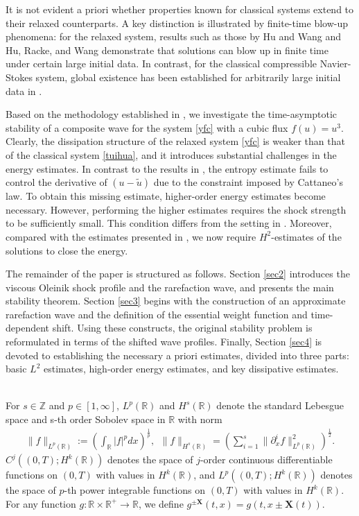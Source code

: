 \documentclass[10pt,reqno]{amsart}
\numberwithin{equation}{section}
\begin{document}
		It is not evident a priori whether properties known for classical systems extend to their relaxed counterparts. A key distinction is illustrated by finite-time blow-up phenomena: for the relaxed system, results such as those by Hu and Wang \cite{ref23} and Hu, Racke, and Wang \cite{ref26} demonstrate that solutions can blow up in finite time under certain large initial data. In contrast, for the classical compressible Navier-Stokes system, global existence has been established for arbitrarily large initial data in \cite{ref28}.
		
		Based on the methodology established in \cite{ref16}, we investigate the time-asymptotic stability of a composite wave for the system \eqref{yfc} with a cubic flux $f(u)=u^3$. Clearly, the dissipation structure of the relaxed system \eqref{yfc} is weaker than that of the classical system \eqref{tuihua}, and it introduces substantial challenges in the energy estimates. In contrast to the results in \cite{ref16}, the entropy estimate fails to control the derivative of $(u-\tilde{u})$ due to the constraint imposed by Cattaneo's law. To obtain this missing estimate, higher-order energy estimates become necessary. However, performing the higher estimates requires the shock strength to be sufficiently small. This condition differs from the setting in \cite{ref16}. Moreover, compared with the estimates presented in \cite{ref16}, we now require $H^2$-estimates of the solutions to close the energy. 
		
		The remainder of the paper is structured as follows. Section \ref{sec2} introduces the viscous Oleinik shock profile and the rarefaction wave, and presents the main stability theorem. Section \ref{sec3} begins with the construction of an approximate rarefaction wave and the definition of the essential weight function and time-dependent shift. Using these constructs, the original stability problem is reformulated in terms of the shifted wave profiles. Finally, Section \ref{sec4} is devoted to establishing the necessary a priori estimates, divided into three parts: basic $L^2$ estimates, high-order energy estimates, and key dissipative estimates.\par
	\ \\
	 For $s\in \mathbb{Z}$ and $p\in[1,\infty]$, $L^p(\mathbb{R})$ and $H^s(\mathbb{R})$ denote the standard Lebesgue space and s-th order Sobolev space in $\mathbb{R}$ with norm
	\begin{align*}
		\| f \|_{L^{p}(\mathbb{R})} := \left( \int_{\mathbb{R}} |f|^{p} dx \right)^{\frac{1}{p}},\ \ \|f\|_{H^s(\mathbb{R})}=\left(\sum_{i=1}^{s}\|\partial_{x}^if \|_{L^{p}(\mathbb{R})}^2\right)^{\frac{1}{2}}.
	\end{align*}
	$C^j((0,T);H^k(\mathbb{R}))$ denotes the space of $j$-order continuous differentiable functions on $(0,T)$ with values in $H^k(\mathbb{R})$, and $L^p((0,T);H^k(\mathbb{R}))$ denotes the space of $p$-th power integrable functions on $(0,T)$ with values in $H^k(\mathbb{R})$. For any function $g:\mathbb{R}\times\mathbb{R}^+\to\mathbb{R}$, we define $g^{\pm\mathbf{X}}(t,x)=g(t,x\pm\mathbf{X}(t))$.
	
\end{document}

